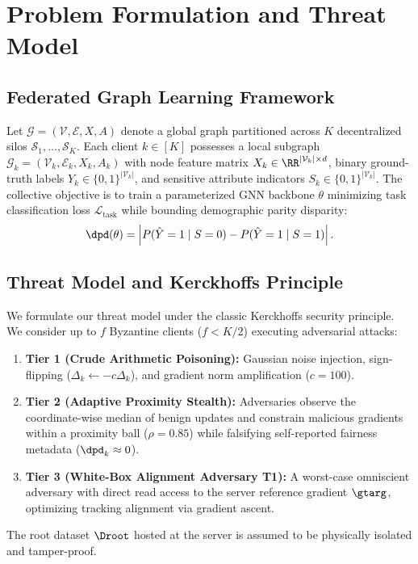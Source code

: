 \section{Problem Formulation and Threat Model}
\label{sec:problem_formulation}

\subsection{Federated Graph Learning Framework}
Let $\mathcal{G} = (\mathcal{V}, \mathcal{E}, X, A)$ denote a global graph partitioned across $K$ decentralized silos $\mathcal{S}_1, \dots, \mathcal{S}_K$. Each client $k \in [K]$ possesses a local subgraph $\mathcal{G}_k = (\mathcal{V}_k, \mathcal{E}_k, X_k, A_k)$ with node feature matrix $X_k \in \RR^{|\mathcal{V}_k| \times d}$, binary ground-truth labels $Y_k \in \{0, 1\}^{|\mathcal{V}_k|}$, and sensitive attribute indicators $S_k \in \{0, 1\}^{|\mathcal{V}_k|}$. The collective objective is to train a parameterized GNN backbone $\theta$ minimizing task classification loss $\mathcal{L}_{\mathrm{task}}$ while bounding demographic parity disparity:
\begin{equation}
\dpd(\theta) = \left| P(\hat{Y}=1 \mid S=0) - P(\hat{Y}=1 \mid S=1) \right|.
\end{equation}

\subsection{Threat Model and Kerckhoffs Principle}
We formulate our threat model under the classic Kerckhoffs security principle. We consider up to $f$ Byzantine clients ($f < K/2$) executing adversarial attacks:
\begin{enumerate}
    \item \textbf{Tier 1 (Crude Arithmetic Poisoning):} Gaussian noise injection, sign-flipping ($\Delta_k \gets -c \Delta_k$), and gradient norm amplification ($c = 100$).
    \item \textbf{Tier 2 (Adaptive Proximity Stealth):} Adversaries observe the coordinate-wise median of benign updates and constrain malicious gradients within a proximity ball ($\rho = 0.85$) while falsifying self-reported fairness metadata ($\dpd_k \approx 0$).
    \item \textbf{Tier 3 (White-Box Alignment Adversary T1):} A worst-case omniscient adversary with direct read access to the server reference gradient $\gtarg$, optimizing tracking alignment via gradient ascent.
\end{enumerate}
The root dataset $\Droot$ hosted at the server is assumed to be physically isolated and tamper-proof.
